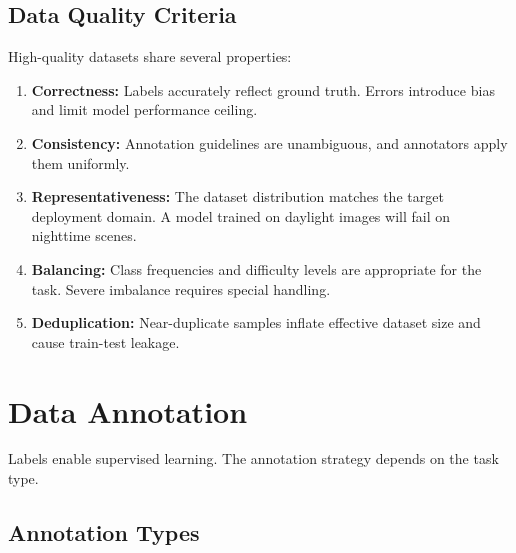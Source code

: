 \subsection{Data Quality Criteria}

High-quality datasets share several properties:

\begin{enumerate}
    \item \textbf{Correctness:} Labels accurately reflect ground truth. Errors introduce bias and limit model performance ceiling.
    \item \textbf{Consistency:} Annotation guidelines are unambiguous, and annotators apply them uniformly.
    \item \textbf{Representativeness:} The dataset distribution matches the target deployment domain. A model trained on daylight images will fail on nighttime scenes.
    \item \textbf{Balancing:} Class frequencies and difficulty levels are appropriate for the task. Severe imbalance requires special handling.
    \item \textbf{Deduplication:} Near-duplicate samples inflate effective dataset size and cause train-test leakage.
\end{enumerate}

\section{Data Annotation}

Labels enable supervised learning. The annotation strategy depends on the task type.

\subsection{Annotation Types}

